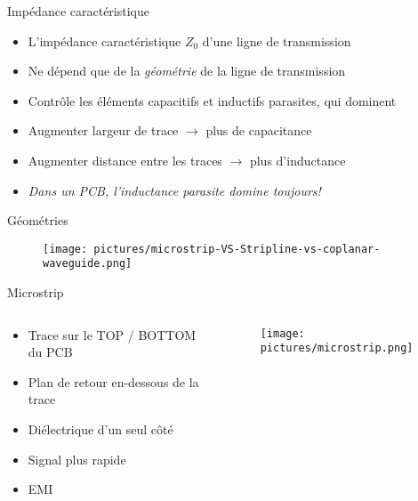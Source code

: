 \begin{frame}{Impédance caractéristique}
    \begin{itemize}
        \item L'impédance caractéristique $Z_0$ d'une ligne de transmission
        \item Ne dépend que de la \textit{géométrie} de la ligne de transmission
        \item Contrôle les éléments capacitifs et inductifs parasites, qui dominent
        \bigskip
        \item Augmenter largeur de trace $\rightarrow$ plus de capacitance
        \item Augmenter distance entre les traces $\rightarrow$ plus d'inductance
        \bigskip
        \item \textit{Dans un PCB, l'inductance parasite domine toujours!}
    \end{itemize}
\end{frame}

\begin{frame}{Géométries}
    \begin{center}
        \begin{figure}
            \centering
            \texttt{[image: pictures/microstrip-VS-Stripline-vs-coplanar-waveguide.png]}
        \end{figure}
    \end{center}
\end{frame}

\begin{frame}{Microstrip}
    \begin{columns}
        \begin{column}{0.66\textwidth}
            \begin{itemize}
                \item Trace sur le TOP / BOTTOM du PCB
                \item Plan de retour en-dessous de la trace
                \item Diélectrique d'un seul côté
                \bigskip
                \item Signal plus rapide
                \item EMI
            \end{itemize}
        \end{column}
        \begin{column}{0.33\textwidth}
            \begin{center}
                \begin{figure}
                    \centering
                    \texttt{[image: pictures/microstrip.png]}
                \end{figure}
            \end{center}
        \end{column}
    \end{columns}
\end{frame}

